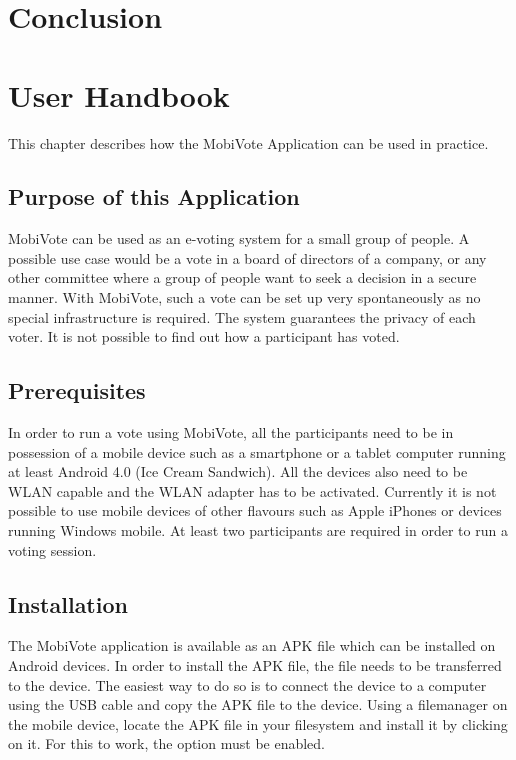 \documentclass[numbers=noenddot, abstract=on, a4paper, headsepline,
footsepline, oneside, draft=off]{scrreprt}
\begin{document}
\chapter{Conclusion}
\label{cha:conclusion}

\printbibliography

\appendix

\chapter{User Handbook}
\label{cha:handbook}
This chapter describes how the MobiVote Application can be used in practice.

\section{Purpose of this Application}
MobiVote can be used as an e-voting system for a small group of people. A
possible use case would be a vote in a board of directors of a company, or any
other committee where a group of people want to seek a decision in a secure
manner. With MobiVote, such a vote can be set up very spontaneously as no
special infrastructure is required. The system guarantees the privacy of each
voter. It is not possible to find out how a participant has voted.

\section{Prerequisites}
In order to run a vote using MobiVote, all the participants need to be in
possession of a mobile device such as a smartphone or a tablet computer running
at least Android 4.0 (Ice Cream Sandwich). All the devices also need to be WLAN
capable and the WLAN adapter has to be activated. Currently it is not possible
to use mobile devices of other flavours such as Apple iPhones or devices running
Windows mobile. At least two participants are required in order to run a voting
session.

\section{Installation}
The MobiVote application is available as an APK file which can be installed on
Android devices. In order to install the APK file, the file needs to be
transferred to the device. The easiest way to do so is to connect the device to
a computer using the USB cable and copy the APK file to the device. Using a filemanager on
the mobile device, locate the APK file in your filesystem and install it by
clicking on it. For this to work, the option  must be enabled.
\end{document}
